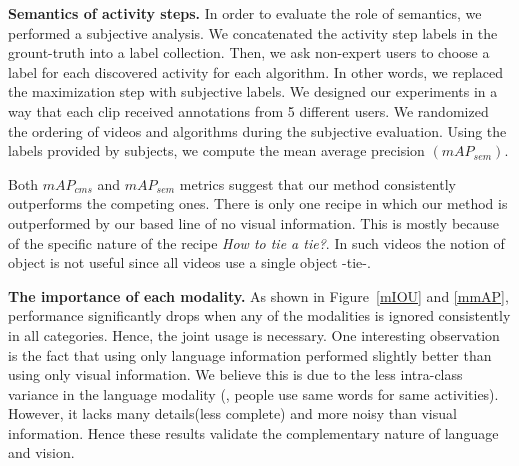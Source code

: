 \vspace{1mm}
\noindent\textbf{Semantics of activity steps.}
In order to evaluate the role of semantics, we performed a subjective analysis. We concatenated the activity step labels in the grount-truth into a label collection. Then, we ask non-expert users to choose a label for each discovered activity for each algorithm. In other words, we replaced the maximization step with subjective labels. We designed our experiments in a way that each clip received annotations from 5 different users. We randomized the ordering of videos and algorithms during the subjective evaluation. Using the labels provided by subjects, we compute the mean average precision $(mAP_{sem})$.

\begin{table}
\caption{Semantic mean-average-precision $mAP_{sem}$.}
\vspace{-3mm}
{\small
{}}
\normalsize
\vspace{-5mm}
\end{table}

Both $mAP_{cms}$ and $mAP_{sem}$ metrics suggest that our method consistently outperforms the competing ones. There is only one recipe in which our method is outperformed by our based line of no visual information. This is mostly because of the specific nature of the recipe \emph{How to tie a tie?}. In such videos the notion of object is not useful since all videos use a single object -tie-.

\vspace{1mm}
\noindent\textbf{The importance of each modality.}
As shown in Figure~\ref{mIOU} and \ref{mmAP}, performance significantly drops when any of the modalities is ignored consistently in all categories. Hence, the joint usage is necessary. One interesting observation is the fact that using only language information performed slightly better than using only visual information. We believe this is due to the less intra-class variance in the language modality (\ie, people use same words for same activities). However, it lacks many details(less complete) and more noisy than visual information. Hence these results validate the complementary nature of language and vision.

